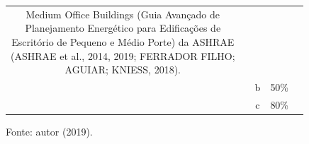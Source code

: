 \begin{table}[H]
\begin{tabular*}{\columnwidth}{@{\extracolsep{\fill}}clcrl}
{{                                                                                                                                                                                            Medium Office Buildings (Guia Avançado de\\
                                                                                                                                                                                            Planejamento Energético para Edificações de\\
                                                                                                                                                                                            Escritório de Pequeno e Médio Porte) da ASHRAE\\
                                                                                                                                                                                            (ASHRAE et al., 2014, 2019; FERRADOR FILHO;\\
                                                                                                                                                                                            AGUIAR; KNIESS, 2018).}}\\
                            &                                                                                                                & b                  & 50\%                & \\
                            &                                                                                                                & c                  & 80\%                & \\\hline
    \end{tabular*}
    \begin{flushleft}
        \par \small Fonte: autor (2019).
    \end{flushleft}
    \label{tab:tabela10}
\end{table}